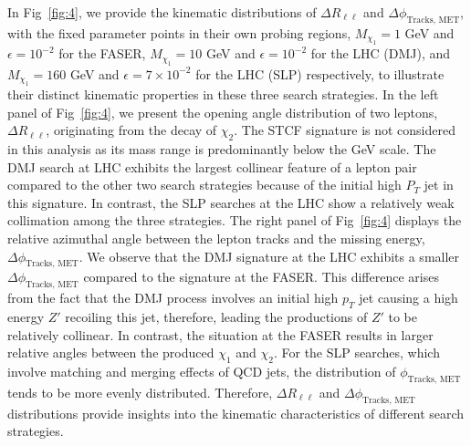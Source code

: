 \documentclass[preprint, superscriptaddress,amsmath, nofootinbib]{revtex4-1}
\begin{document}
In Fig~\ref{fig:4}, we provide the kinematic distributions of $\Delta R_{\ell \ell}$ and $\Delta \phi_{\text{Tracks, MET}}$, with the fixed parameter points in their own probing regions, $M_{\chi_1} = 1$ GeV and $\epsilon = 10^{-2}$ for the FASER, $M_{\chi_1} = 10$ GeV and $\epsilon = 10^{-2}$ for the LHC (DMJ), and $M_{\chi_1} = 160$ GeV and $\epsilon = 7\times10^{-2}$ for the LHC (SLP) respectively, to illustrate their distinct kinematic properties in these three search strategies. In the left panel of Fig~\ref{fig:4}, we present the opening angle distribution of two leptons, $\Delta R_{\ell \ell}$, originating from the decay of $\chi_2$. The STCF signature is not considered in this analysis as its mass range is predominantly below the GeV scale. The DMJ search at LHC exhibits the largest collinear feature of a lepton pair compared to the other two search strategies because of the initial high $P_T$ jet in this signature. In contrast, the SLP searches at the LHC show a relatively weak collimation among the three strategies. 
The right panel of Fig~\ref{fig:4} displays the relative azimuthal angle between the lepton tracks and the missing energy, $\Delta \phi_{\text{Tracks, MET}}$. We observe that the DMJ signature at the LHC exhibits a smaller $\Delta \phi_{\text{Tracks, MET}}$ compared to the signature at the FASER. This difference arises from the fact that the DMJ process involves an initial high $p_T$ jet causing a high energy $Z'$ recoiling this jet, therefore, leading the productions of $Z'$ to be relatively collinear. In contrast, the situation at the FASER results in larger relative angles between the produced $\chi_1$ and $\chi_2$. 
For the SLP searches, which involve matching and merging effects of QCD jets, the distribution of $\phi_{\text{Tracks, MET}}$ tends to be more evenly distributed. Therefore, $\Delta R_{\ell \ell}$ and $\Delta \phi_{\text{Tracks, MET}}$ distributions provide insights into the kinematic characteristics of different search strategies. %
\end{document}
